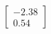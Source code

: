 \documentclass[preview]{standalone}
\begin{document}
\begin{align*}
\begin{bmatrix} -2.38 \\ 0.54 \end{bmatrix}
\end{align*}
\end{document}
